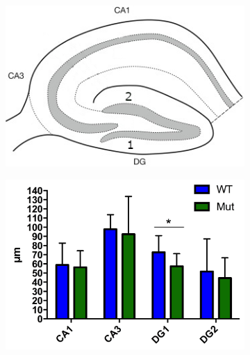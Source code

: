 \begin{figure}[h]
\begin{subfigure}[h]{0.329\textwidth}
			\end{subfigure}
			\begin{subfigure}[h]{0.329\textwidth}
				\caption{}
				\label{fig:hippIllu}
				\includegraphics[width=\textwidth]{./Images/HippSchema.jpg}
			\end{subfigure}
			\begin{subfigure}[h]{0.329\textwidth}
				\caption{}
				\label{fig:NeunQuantifNasal}
				\includegraphics[width=\textwidth]{./Images/Immuno/NeuN/Quantif_Nasal.jpg}
			\end{subfigure}
			\begin{subfigure}[h]{0.329\textwidth}
				\caption{}
				\label{fig:NeunQuantifMilieu}

\end{subfigure}
\end{figure}
